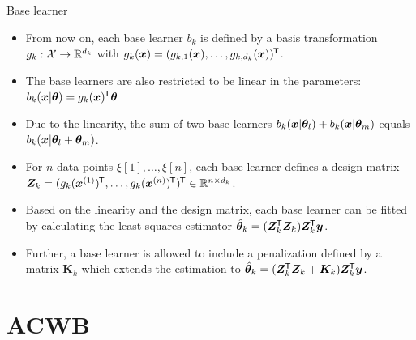 \documentclass[t,10pt]{beamer}
\begin{document}
\begin{frame}{Base learner}
  \begin{itemize}
    \item
      From now on, each base learner $b_k$ is defined by a basis transformation $g_k : \Xspace \to \R^{d_k}$ with $g_k(\xv) = (g_{k,1}(\xv), \dots, g_{k,d_k}(\xv))^\tran$.

    \item
      The base learners are also restricted to be linear in the parameters: $b_k(\xv | \tb) = g_k(\xv)^\tran \tb$

    \item
      Due to the linearity, the sum of two base learners $b_k(\xv | \tb_l) + b_k(\xv | \tb_m)$ equals $b_k(\xv | \tb_l + \tb_m)$.

    \item
      For $n$ data points $\xi[1], \dots, \xi[n]$, each base learner defines a design matrix $\design_k = (g_k(\xi[1])^\tran, \dots, g_k(\xi[n])^\tran)^\tran\in\R^{n\times d_k}$.

    \item
      Based on the linearity and the design matrix, each base learner can be fitted by calculating the least squares estimator $\tbh_k = (\design_\blk^\tran \design_\blk) \design_k^\tran \yv$.

    \item
      Further, a base learner is allowed to include a penalization defined by a matrix $\bm{K}_k$ which extends the estimation to $\tbh_k = (\design_\blk^\tran \design_\blk + \bm{K}_k) \design_k^\tran \yv$.

  \end{itemize}
\end{frame}

\section*{ACWB}
\end{document}
